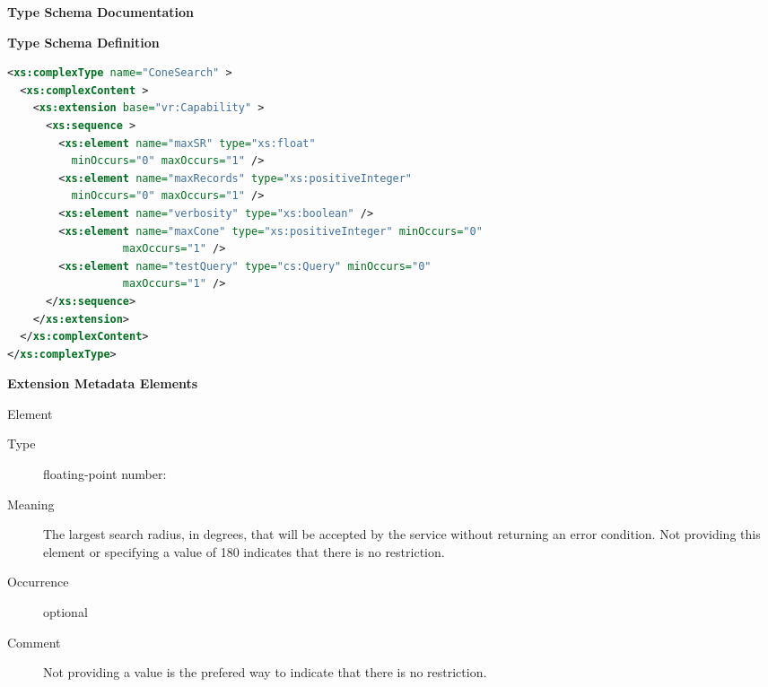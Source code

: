 \documentclass[11pt,a4paper]{ivoa}
\begin{document}
\begin{generated}
\begingroup
        \renewcommand*\descriptionlabel[1]{%
        \hbox to 5.5em{\emph{#1}\hfil}}\vspace{2ex}\noindent\textbf{ Type Schema Documentation}


\vspace{1ex}\noindent\textbf{ Type Schema Definition}

\begin{lstlisting}[language=XML,basicstyle=\footnotesize]
<xs:complexType name="ConeSearch" >
  <xs:complexContent >
    <xs:extension base="vr:Capability" >
      <xs:sequence >
        <xs:element name="maxSR" type="xs:float"
          minOccurs="0" maxOccurs="1" />
        <xs:element name="maxRecords" type="xs:positiveInteger"
          minOccurs="0" maxOccurs="1" />
        <xs:element name="verbosity" type="xs:boolean" />
        <xs:element name="maxCone" type="xs:positiveInteger" minOccurs="0"
                  maxOccurs="1" />
        <xs:element name="testQuery" type="cs:Query" minOccurs="0"
                  maxOccurs="1" />
      </xs:sequence>
    </xs:extension>
  </xs:complexContent>
</xs:complexType>
\end{lstlisting}

\vspace{0.5ex}\noindent\textbf{ Extension Metadata Elements}

\begingroup\small\begin{bigdescription}\item[Element \xmlel{maxSR}]
\begin{description}
\item[Type] floating-point number: 
\item[Meaning] The largest search radius, in degrees, that will be
                        accepted by the service without returning an error
                        condition.  Not providing this element or
                        specifying a value of 180 indicates that there
                        is no restriction.
\item[Occurrence] optional
\item[Comment] Not providing a value is the prefered way to indicate
                        that there is no restriction.


\end{description}
\end{bigdescription}
\end{generated}
\end{document}

